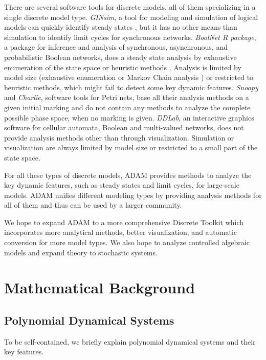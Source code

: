 \documentclass[10pt]{bmc_article}
\begin{document}
There are  several software tools for discrete models, all of them specializing in a single discrete model type.
{\it GINsim}, a tool for modeling and simulation of logical models can quickly identify steady states \cite{GINsim}, but it has no other means than simulation to identify limit cycles for synchronous networks. {\it BoolNet R package}, a package for inference and analysis of synchronous, asynchronous, and probabilistic Boolean networks, does a steady state analysis by exhaustive enumeration of the state space or heuristic methods \cite{boolnet}. Analysis is limited by model size (exhaustive enumeration or Markov Chain analysis ) or restricted to heuristic methods, which might fail to detect some key dynamic features.
{\it Snoopy} and {\it Charlie}, software tools for Petri nets, base all their analysis methods on a given initial marking and do not contain any methods to analyze the complete possible phase space, when no marking is given. {\it DDLab}, an interactive graphics software for cellular automata, Boolean and multi-valued networks, does not provide analysis methods other than through visualization. Simulation or visualization are always limited by model size or restricted to a small part of the state space.

For all these types of discrete models, ADAM provides methods to analyze the key dynamic features, such as steady states and limit cycles, for large-scale models. ADAM unifies different modeling types by providing analysis methods for all of them and thus can be used by a larger community.

We hope to expand ADAM to a more comprehensive Discrete Toolkit which incorporates more
analytical methods, better visualization, and automatic conversion for more model types.
We also hope to analyze controlled algebraic models and expand theory to stochastic systems.


\appendix
\section{Mathematical Background}
\subsection{Polynomial Dynamical Systems}
To be self-contained, we briefly explain polynomial dynamical systems and their key features.
\end{document}
